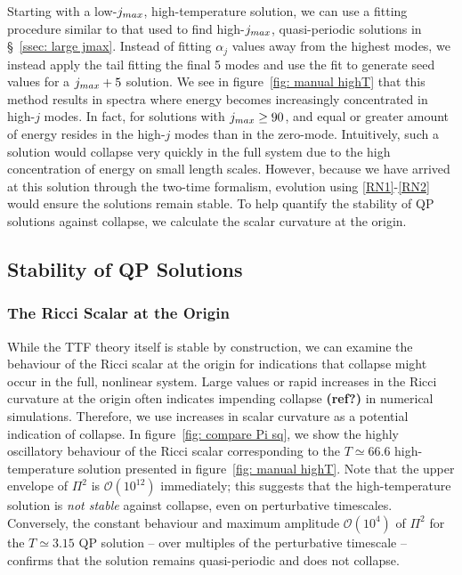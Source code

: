 \documentclass[../PhD.tex]{subfiles}
\begin{document}
Starting with a low-$j_{max}$, high-temperature solution, we can use a fitting procedure similar to that used to find high-$j_{max}$, quasi-periodic solutions in \S~\!\ref{ssec: large jmax}. Instead of fitting $\alpha_j$ values away from the highest modes, we instead apply the tail fitting the final 5 modes and use the fit to generate seed values for a $j_{max} + 5$ solution. We see in figure~\ref{fig: manual highT} that this method results in spectra where energy becomes increasingly concentrated in high-$j$ modes. In fact, for solutions with $j_{max} \geq 90$, and equal or greater amount of energy resides in the high-$j$ modes than in the zero-mode. Intuitively, such a solution would collapse very quickly in the full system due to the high concentration of energy on small length scales. However, because we have arrived at this solution through the two-time formalism, evolution using \eqref{RN1}-\eqref{RN2} would ensure the solutions remain stable. To help quantify the stability of QP solutions against collapse, we calculate the scalar curvature at the origin. 


\subsection{Stability of QP Solutions}
\subsubsection{The Ricci Scalar at the Origin}

While the TTF theory itself is stable by construction, we can examine the behaviour of the Ricci scalar at the origin for indications that collapse might occur in the full, nonlinear system. Large values or rapid increases in the Ricci curvature at the origin often indicates impending collapse {\bf (ref?)} in numerical simulations. Therefore, we use increases in scalar curvature as a potential indication of collapse. In figure~\ref{fig: compare Pi sq}, we show the highly oscillatory behaviour of the Ricci scalar corresponding to the $T\simeq 66.6$ high-temperature solution presented in figure~\ref{fig: manual highT}. Note that the upper envelope of $\Pi^2$ is $\mathcal{O}(10^{12})$ immediately; this suggests that the high-temperature solution is \emph{not stable} against collapse, even on perturbative timescales. Conversely, the constant behaviour and maximum amplitude $\mathcal{O}(10^4)$ of $\Pi^2$ for the $T \simeq 3.15$ QP solution -- over multiples of the perturbative timescale -- confirms that the solution remains quasi-periodic and does not collapse.
\end{document}
